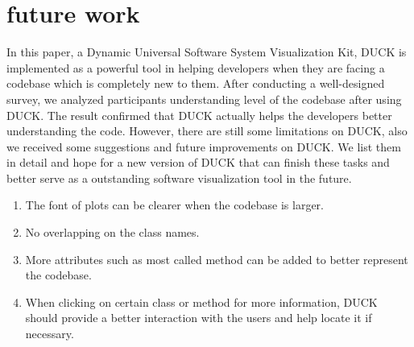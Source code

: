 \documentclass{sig-alternate}
\begin{document}
\section{future work}
In this paper, a Dynamic Universal Software System Visualization Kit, DUCK is implemented as a powerful tool in helping developers when they are facing a codebase which is completely new to them. After conducting a well-designed survey, we analyzed participants understanding level of the codebase after using DUCK. The result confirmed that DUCK actually helps the developers better understanding the code. However, there are still some limitations on DUCK, also we received some suggestions and future improvements on DUCK. We list them in detail and hope for a new version of DUCK that can finish these tasks and better serve as a outstanding software visualization tool in the future. 
\begin{enumerate}
\item The font of plots can be clearer when the codebase is larger.
\vspace{-6pt}
\item No overlapping on the class names.
\vspace{-6pt}
\item More attributes such as most called method can be added to better represent the codebase.
\vspace{-6pt}
\item When clicking on certain class or method for more information, DUCK should provide a better interaction with the users and help locate it if necessary.
\end{enumerate}



%

%
%
\appendix
\end{document}
